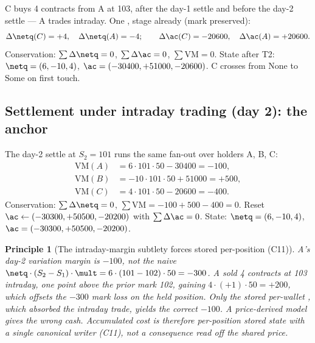 \documentclass[11pt,a4paper]{article}
\newtheorem{principle}[definition]{Principle}
\begin{document}
C buys 4 contracts from A at 103, after the day-1 settle and before the day-2 settle --- A trades
intraday. One , stage already  (mark preserved):
\[
\Delta\netq(C)=+4,\quad \Delta\netq(A)=-4;\qquad
\Delta\ac(C) = -20600,\quad \Delta\ac(A) = +20600.
\]
Conservation: $\sum\Delta\netq=0$, $\sum\Delta\ac=0$, $\sum\mathrm{VM}=0$. State after T2:
$\netq=(6,-10,4)$, $\ac=(-30400,+51000,-20600)$. C crosses from $\mathrm{None}$ to $\mathrm{Some}$ on
first touch.

\subsection{Settlement under intraday trading (day 2): the anchor}
\label{sec:anchor}

{\raggedright
The day-2 settle at $S_2=101$ runs the same fan-out over holders A, B, C:
\[
\begin{aligned}
\mathrm{VM}(A) &= 6\cdot 101\cdot 50 - 30400 = -100,\\
\mathrm{VM}(B) &= -10\cdot 101\cdot 50 + 51000 = +500,\\
\mathrm{VM}(C) &= 4\cdot 101\cdot 50 - 20600 = -400.
\end{aligned}
\]
Conservation: $\sum\Delta\netq=0$, $\sum\mathrm{VM} = -100+500-400 = 0$. Reset
$\ac\leftarrow(-30300,+50500,-20200)$ with $\sum\Delta\ac=0$. State: $\netq=(6,-10,4)$,
$\ac=(-30300,+50500,-20200)$.\par}

\begin{principle}[The intraday-margin subtlety forces stored per-position \ac{} (C11)]
A's day-2 variation margin is $-100$, not the naive $\netq\cdot(S_2-S_1)\cdot\mult =
6\cdot(101-102)\cdot 50 = -300$. A sold 4 contracts at 103 intraday, one point above the prior mark
102, gaining $4\cdot(+1)\cdot 50=+200$, which offsets the $-300$ mark loss on the held position. Only
the stored per-wallet \ac{}, which absorbed the intraday trade, yields the correct $-100$. A
price-derived model gives the wrong cash. Accumulated cost is therefore per-position stored state with
a single canonical writer (C11), not a consequence read off the shared price.
\end{principle}
\end{document}
